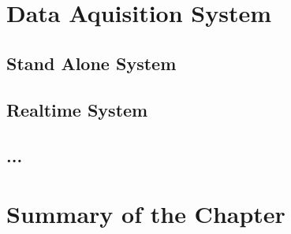 \documentclass[a4paper,12pt]{book}
\begin{document}
\section{Data Aquisition System}
\subsection{Stand Alone System}
\subsection{Realtime System}
\subsection{...}
\section{Summary of the Chapter}

\appendix
\end{document}
